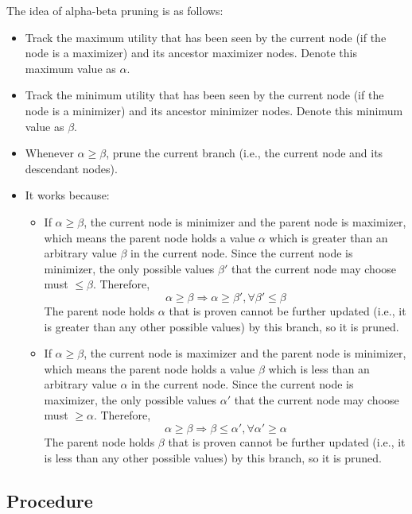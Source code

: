 \documentclass{note}
\begin{document}
The idea of alpha-beta pruning is as follows: 
\begin{itemize}
    \item Track the maximum utility that has been seen by the current node (if the node is a maximizer) and its ancestor maximizer nodes. Denote this maximum value as $\alpha$.
    \item Track the minimum utility that has been seen by the current node (if the node is a minimizer) and its ancestor minimizer nodes. Denote this minimum value as $\beta$.
    \item Whenever $\alpha \ge \beta$, prune the current branch (i.e., the current node and its descendant nodes).
    \item It works because: 
    \begin{itemize}        
        \item If $\alpha \ge \beta$, the current node is minimizer and the parent node is maximizer, which means the parent node holds a value $\alpha$ which is greater than an arbitrary value $\beta$ in the current node. Since the current node is minimizer, the only possible values $\beta'$ that the current node may choose must $\le \beta$. Therefore,
        \begin{equation*}
            \alpha \ge \beta \Rightarrow \alpha \ge \beta', \forall \beta' \le \beta
        \end{equation*}
        The parent node holds $\alpha$ that is proven cannot be further updated (i.e., it is greater than any other possible values) by this branch, so it is pruned.
        
        \item If $\alpha \ge \beta$, the current node is maximizer and the parent node is minimizer, which means the parent node holds a value $\beta$ which is less than an arbitrary value $\alpha$ in the current node. Since the current node is maximizer, the only possible values $\alpha'$ that the current node may choose must $\ge \alpha$. Therefore, 
        \begin{equation*}
            \alpha \ge \beta \Rightarrow \beta \le \alpha', \forall \alpha' \ge \alpha
        \end{equation*}
        The parent node holds $\beta$ that is proven cannot be further updated (i.e., it is less than any other possible values) by this branch, so it is pruned.
    \end{itemize}
\end{itemize}

\subsection{Procedure}
\end{document}
